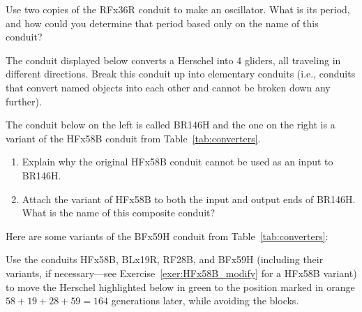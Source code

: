 \begin{multicols}{2}
\mfilbreak


\begin{problem}\label{exer:RFx36R_osc}
	Use two copies of the RFx36R conduit to make an oscillator. What is its period, and how could you determine that period based only on the name of this conduit?
\end{problem}


\mfilbreak


\begin{problem}\label{exer:H_to_4G}
	The conduit displayed below converts a Herschel into 4 gliders, all traveling in different directions. Break this conduit up into elementary conduits (i.e., conduits that convert named objects into each other and cannot be broken down any further).
	
	\begin{center}
	\end{center}
	
\end{problem}


\mfilbreak


\begin{problem}\label{exer:HFx58B_modify}
	The conduit below on the left is called BR146H and the one on the right is a variant of the HFx58B conduit from Table~\ref{tab:converters}.
	
	\begin{center}
		 \qquad {}
	\end{center}

	\begin{enumerate}[label=\bf\color{ocre}(\alph*)]
		\item Explain why the original HFx58B conduit cannot be used as an input to BR146H.
	
		\item Attach the variant of HFx58B to both the input and output ends of BR146H. What is the name of this composite conduit?
	\end{enumerate}
\end{problem}


\mfilbreak


\begin{problem}\label{exer:herschel_variants}
	Here are some variants of the BFx59H conduit from Table~\ref{tab:converters}:
	\begin{center}
	\end{center}
	Use the conduits HFx58B, BLx19R, RF28B, and BFx59H (including their variants, if necessary---see Exercise~\ref{exer:HFx58B_modify} for a HFx58B variant) to move the Herschel highlighted below in green to the position marked in orange $58+19+28+59=164$ generations later, while avoiding the blocks.	
	\begin{center}
	\end{center}
\end{problem}



\end{multicols}
